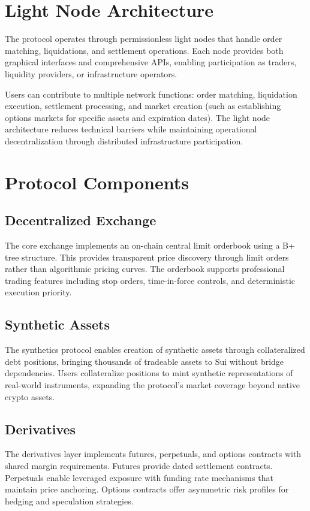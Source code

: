 \documentclass[12pt]{article}
\begin{document}
\section{Light Node Architecture}
The protocol operates through permissionless light nodes that handle order matching, liquidations, and settlement operations. Each node provides both graphical interfaces and comprehensive APIs, enabling participation as traders, liquidity providers, or infrastructure operators.

Users can contribute to multiple network functions: order matching, liquidation execution, settlement processing, and market creation (such as establishing options markets for specific assets and expiration dates). The light node architecture reduces technical barriers while maintaining operational decentralization through distributed infrastructure participation.

\section{Protocol Components}

\subsection{Decentralized Exchange}
The core exchange implements an on-chain central limit orderbook using a B+ tree structure. This provides transparent price discovery through limit orders rather than algorithmic pricing curves. The orderbook supports professional trading features including stop orders, time-in-force controls, and deterministic execution priority.

\subsection{Synthetic Assets}
The synthetics protocol enables creation of synthetic assets through collateralized debt positions, bringing thousands of tradeable assets to Sui without bridge dependencies. Users collateralize positions to mint synthetic representations of real-world instruments, expanding the protocol's market coverage beyond native crypto assets.

\subsection{Derivatives}
The derivatives layer implements futures, perpetuals, and options contracts with shared margin requirements. Futures provide dated settlement contracts. Perpetuals enable leveraged exposure with funding rate mechanisms that maintain price anchoring. Options contracts offer asymmetric risk profiles for hedging and speculation strategies.
\end{document}
